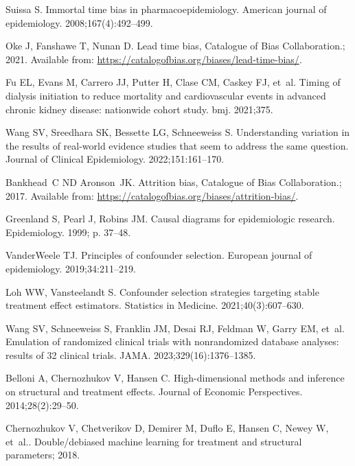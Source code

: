 \documentclass[10pt,letterpaper]{article}
\begin{document}
\begin{thebibliography}{100}
  Suissa S.
  \newblock Immortal time bias in pharmacoepidemiology.
  \newblock American journal of epidemiology. 2008;167(4):492--499.

  Oke J, Fanshawe T, Nunan D. Lead time bias, Catalogue of Bias Collaboration.; 2021.
  \newblock Available from: \url{https://catalogofbias.org/biases/lead-time-bias/}.

  Fu EL, Evans M, Carrero JJ, Putter H, Clase CM, Caskey FJ, et~al.
  \newblock Timing of dialysis initiation to reduce mortality and cardiovascular events in advanced chronic kidney disease: nationwide cohort study.
  \newblock bmj. 2021;375.

  Wang SV, Sreedhara SK, Bessette LG, Schneeweiss S.
  \newblock Understanding variation in the results of real-world evidence studies that seem to address the same question.
  \newblock Journal of Clinical Epidemiology. 2022;151:161--170.

  Bankhead~C ND Aronson~JK. Attrition bias, Catalogue of Bias Collaboration.; 2017.
  \newblock Available from: \url{https://catalogofbias.org/biases/attrition-bias/}.

  Greenland S, Pearl J, Robins JM.
  \newblock Causal diagrams for epidemiologic research.
  \newblock Epidemiology. 1999; p. 37--48.

  VanderWeele TJ.
  \newblock Principles of confounder selection.
  \newblock European journal of epidemiology. 2019;34:211--219.

  Loh WW, Vansteelandt S.
  \newblock Confounder selection strategies targeting stable treatment effect estimators.
  \newblock Statistics in Medicine. 2021;40(3):607--630.

  Wang SV, Schneeweiss S, Franklin JM, Desai RJ, Feldman W, Garry EM, et~al.
  \newblock Emulation of randomized clinical trials with nonrandomized database analyses: results of 32 clinical trials.
  \newblock JAMA. 2023;329(16):1376--1385.

  Belloni A, Chernozhukov V, Hansen C.
  \newblock High-dimensional methods and inference on structural and treatment effects.
  \newblock Journal of Economic Perspectives. 2014;28(2):29--50.

  Chernozhukov V, Chetverikov D, Demirer M, Duflo E, Hansen C, Newey W, et~al.. Double/debiased machine learning for treatment and structural parameters; 2018.


\end{thebibliography}
\end{document}
